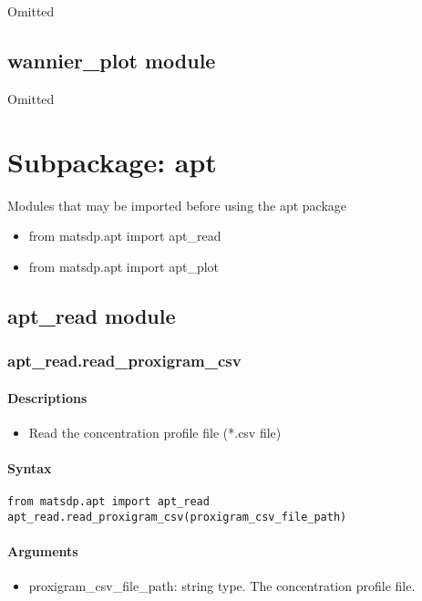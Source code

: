 \documentclass[12pt]{book}
\begin{document}
Omitted

\section{wannier\_plot module}

Omitted

\chapter{Subpackage: apt}

Modules that may be imported before using the apt package
\begin{itemize}
\item from matsdp.apt import apt\_read
\item from matsdp.apt import apt\_plot
\end{itemize}

\section{apt\_read module}

\subsection{apt\_read.read\_proxigram\_csv}

\subsubsection{Descriptions}
\begin{itemize}
\item Read the concentration profile file (*.csv file)
\end{itemize}

\subsubsection{Syntax}
\begin{lstlisting}
from matsdp.apt import apt_read
apt_read.read_proxigram_csv(proxigram_csv_file_path)
\end{lstlisting}

\subsubsection{Arguments}

\begin{itemize}
\item proxigram\_csv\_file\_path: string type. The concentration profile file.
\end{itemize}
\end{document}
